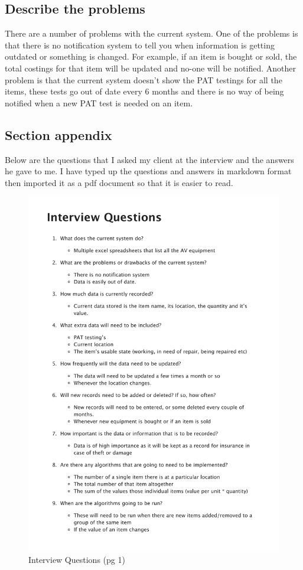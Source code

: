 \subsection{Describe the problems}

There are a number of problems with the current system. One of the problems is that there is no notification system to tell you when information is getting outdated or something is changed. For example, if an item is bought or sold, the total costings for that item will be updated and no-one will be notified. Another problem is that the current system doesn't show the PAT testings for all the items, these tests go out of date every 6 months and there is no way of being notified when a new PAT test is needed on an item.

\subsection{Section appendix}

Below are the questions that I asked my client at the interview and the answers he gave to me. I have typed up the questions and answers in markdown format then imported it as a pdf document so that it is easier to read.

\newpage

\begin{figure}[H]
    \caption{Interview Questions (pg 1)} \label{fig: Interview Questions}
    \includegraphics[page=1,width=\textwidth]{./Analysis/Interview/interview_questions.pdf}
\end{figure}		
		
